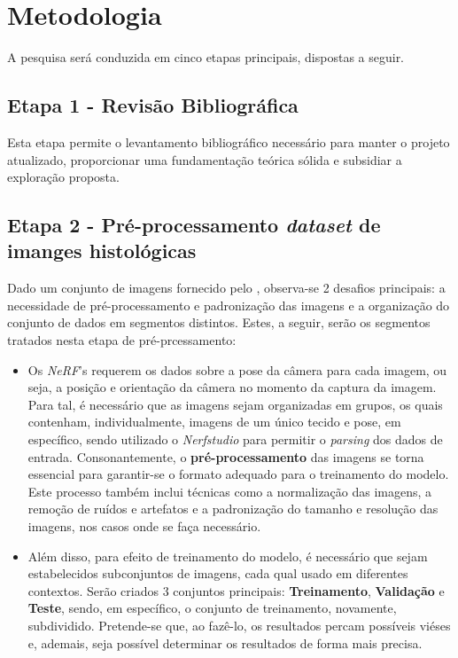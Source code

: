 \section{Metodologia}

A pesquisa será conduzida em cinco etapas principais, dispostas a seguir.


\subsection{Etapa 1 - Revisão Bibliográfica}

Esta etapa permite o levantamento bibliográfico necessário para manter o projeto atualizado, proporcionar uma fundamentação teórica sólida e subsidiar a exploração proposta.


\subsection{Etapa 2 - Pré-processamento \textit{dataset} de imanges histológicas}

  Dado um conjunto de imagens fornecido pelo %
  , observa-se 2 desafios principais: a necessidade de pré-processamento e padronização das imagens e a organização do conjunto de dados em segmentos distintos. Estes, a seguir, serão os segmentos tratados nesta etapa de pré-prcessamento:

\begin{itemize}
  \item Os \textit{NeRF}'s requerem os dados sobre a pose da câmera para cada imagem, ou seja, a posição e orientação da câmera no momento da captura da imagem. Para tal, é necessário que as imagens sejam organizadas em grupos, os quais contenham, individualmente, imagens de um único tecido e pose, em específico, sendo utilizado o \textit{Nerfstudio} para permitir o \textit{parsing} dos dados de entrada. Consonantemente, o \textbf{pré-processamento} das imagens se torna essencial para garantir-se o formato adequado para o treinamento do modelo. Este processo também inclui técnicas como a normalização das imagens, a remoção de ruídos e artefatos e a padronização do tamanho e resolução das imagens, nos casos onde se faça necessário.

    \item  Além disso, para efeito de treinamento do modelo, é necessário que sejam estabelecidos subconjuntos de imagens, cada qual usado em diferentes contextos. Serão criados 3 conjuntos principais: \textbf{Treinamento}, \textbf{Validação} e  \textbf{Teste}, sendo, em específico, o conjunto de treinamento, novamente, subdividido. Pretende-se que, ao fazê-lo, os resultados percam possíveis viéses e, ademais, seja possível determinar os resultados de forma mais precisa.
  \end{itemize}

